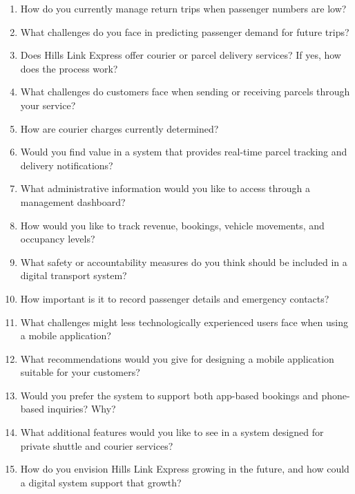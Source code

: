 \begin{enumerate}
\item How do you currently manage return trips when passenger numbers are low?
\item What challenges do you face in predicting passenger demand for future trips?
\item Does Hills Link Express offer courier or parcel delivery services? If yes, how does the process work?
\item What challenges do customers face when sending or receiving parcels through your service?
\item How are courier charges currently determined?
\item Would you find value in a system that provides real-time parcel tracking and delivery notifications?
\item What administrative information would you like to access through a management dashboard?
\item How would you like to track revenue, bookings, vehicle movements, and occupancy levels?
\item What safety or accountability measures do you think should be included in a digital transport system?
\item How important is it to record passenger details and emergency contacts?
\item What challenges might less technologically experienced users face when using a mobile application?
\item What recommendations would you give for designing a mobile application suitable for your customers?
\item Would you prefer the system to support both app-based bookings and phone-based inquiries? Why?
\item What additional features would you like to see in a system designed for private shuttle and courier services?
\item How do you envision Hills Link Express growing in the future, and how could a digital system support that growth?
\end{enumerate}
